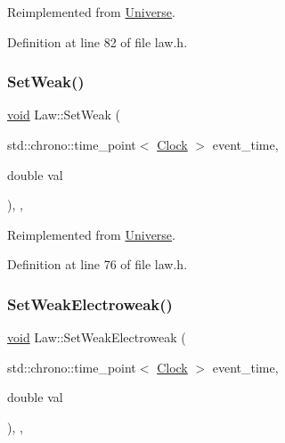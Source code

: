 Reimplemented from \mbox{\hyperlink{class_universe_a1b2d6197ddf3d613cc30bd04d22ed8b7}{Universe}}.



Definition at line 82 of file law.\+h.

\mbox{\label{class_law_a1009b4e0bc0b91f41d48dc137529e97b}} 
\subsubsection{\texorpdfstring{Set\+Weak()}{SetWeak()}}
{\footnotesize\ttfamily \mbox{\hyperlink{glad_8h_a950fc91edb4504f62f1c577bf4727c29}{void}} Law\+::\+Set\+Weak (\begin{DoxyParamCaption}\item[{std\+::chrono\+::time\+\_\+point$<$ \mbox{\hyperlink{universe_8h_a0ef8d951d1ca5ab3cfaf7ab4c7a6fd80}{Clock}} $>$}]{event\+\_\+time,  }\item[{double}]{val }\end{DoxyParamCaption})\hspace{0.3cm}{\ttfamily [inline]}, {\ttfamily [final]}, {\ttfamily [virtual]}}



Reimplemented from \mbox{\hyperlink{class_universe_a0f5cd04081b41ee931c0557dc397f6fb}{Universe}}.



Definition at line 76 of file law.\+h.

\mbox{\label{class_law_a65e5e757041c1e72bb046eccbb6d66db}} 
\subsubsection{\texorpdfstring{Set\+Weak\+Electroweak()}{SetWeakElectroweak()}}
{\footnotesize\ttfamily \mbox{\hyperlink{glad_8h_a950fc91edb4504f62f1c577bf4727c29}{void}} Law\+::\+Set\+Weak\+Electroweak (\begin{DoxyParamCaption}\item[{std\+::chrono\+::time\+\_\+point$<$ \mbox{\hyperlink{universe_8h_a0ef8d951d1ca5ab3cfaf7ab4c7a6fd80}{Clock}} $>$}]{event\+\_\+time,  }\item[{double}]{val }\end{DoxyParamCaption})\hspace{0.3cm}{\ttfamily [inline]}, {\ttfamily [final]}, {\ttfamily [virtual]}}



